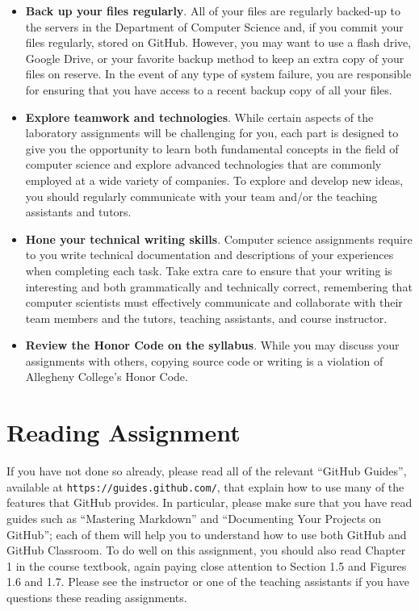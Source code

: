 \documentclass[11pt]{article}
\newcommand{\url}[1]{\lstinline{#1}}
\begin{document}
\begin{itemize}
\item {\bf Back up your files regularly}. All of your files are regularly backed-up to the servers in the Department of
  Computer Science and, if you commit your files regularly, stored on GitHub. However, you may want to use a flash
  drive, Google Drive, or your favorite backup method to keep an extra copy of your files on reserve. In the event of
  any type of system failure, you are responsible for ensuring that you have access to a recent backup copy of all your
  files.

\item {\bf Explore teamwork and technologies}. While certain aspects of the laboratory assignments will be challenging
  for you, each part is designed to give you the opportunity to learn both fundamental concepts in the field of computer
  science and explore advanced technologies that are commonly employed at a wide variety of companies. To explore and
  develop new ideas, you should regularly communicate with your team and/or the teaching assistants and tutors.

\item {\bf Hone your technical writing skills}. Computer science assignments require to you write technical
  documentation and descriptions of your experiences when completing each task. Take extra care to ensure that your
  writing is interesting and both grammatically and technically correct, remembering that computer scientists must
  effectively communicate and collaborate with their team members and the tutors, teaching assistants, and course
  instructor.

\item {\bf Review the Honor Code on the syllabus}. While you may discuss your assignments with others, copying source
  code or writing is a violation of Allegheny College's Honor Code.

\end{itemize}

\section*{Reading Assignment}

If you have not done so already, please read all of the relevant ``GitHub Guides'', available at
\url{https://guides.github.com/}, that explain how to use many of the features that GitHub provides. In particular,
please make sure that you have read guides such as ``Mastering Markdown'' and ``Documenting Your Projects on GitHub'';
each of them will help you to understand how to use both GitHub and GitHub Classroom. To do well on this assignment, you
should also read Chapter 1 in the course textbook, again paying close attention to Section 1.5 and Figures 1.6 and 1.7.
Please see the instructor or one of the teaching assistants if you have questions these reading assignments.
\end{document}
